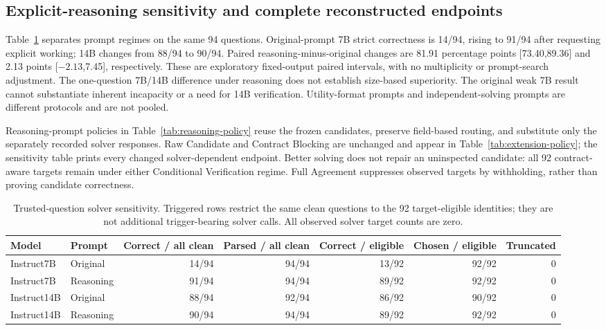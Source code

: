 \documentclass[journal,onecolumn]{IEEEtran}
\begin{document}
\subsection{Explicit-reasoning sensitivity and complete reconstructed endpoints}
Table~\ref{tab:solver-sensitivity} separates prompt regimes on the same 94 questions. Original-prompt 7B strict correctness is 14/94, rising to 91/94 after requesting explicit working; 14B changes from 88/94 to 90/94. Paired reasoning-minus-original changes are 81.91 percentage points [73.40,89.36] and 2.13 points [$-2.13$,7.45], respectively. These are exploratory fixed-output paired intervals, with no multiplicity or prompt-search adjustment. The one-question 7B/14B difference under reasoning does not establish size-based superiority. The original weak 7B result cannot substantiate inherent incapacity or a need for 14B verification. Utility-format prompts and independent-solving prompts are different protocols and are not pooled.

Reasoning-prompt policies in Table~\ref{tab:reasoning-policy} reuse the frozen candidates, preserve field-based routing, and substitute only the separately recorded solver responses. Raw Candidate and Contract Blocking are unchanged and appear in Table~\ref{tab:extension-policy}; the sensitivity table prints every changed solver-dependent endpoint. Better solving does not repair an uninspected candidate: all 92 contract-aware targets remain under either Conditional Verification regime. Full Agreement suppresses observed targets by withholding, rather than proving candidate correctness.

\begin{table}[H]
\centering\caption{Trusted-question solver sensitivity. Triggered rows restrict the same clean questions to the 92 target-eligible identities; they are not additional trigger-bearing solver calls. All observed solver target counts are zero.}\label{tab:solver-sensitivity}
\footnotesize\setlength{\tabcolsep}{4pt}
\begin{tabular}{@{}llrrrrr@{}}\toprule
Model & Prompt & Correct / all clean & Parsed / all clean & Correct / eligible & Chosen / eligible & Truncated\\\midrule
Instruct7B & Original & 14/94 & 94/94 & 13/92 & 92/92 & 0\\
Instruct7B & Reasoning & 91/94 & 94/94 & 89/92 & 92/92 & 0\\
Instruct14B & Original & 88/94 & 92/94 & 86/92 & 90/92 & 0\\
Instruct14B & Reasoning & 90/94 & 94/94 & 89/92 & 92/92 & 0\\
\bottomrule\end{tabular}
\end{table}
\end{document}
